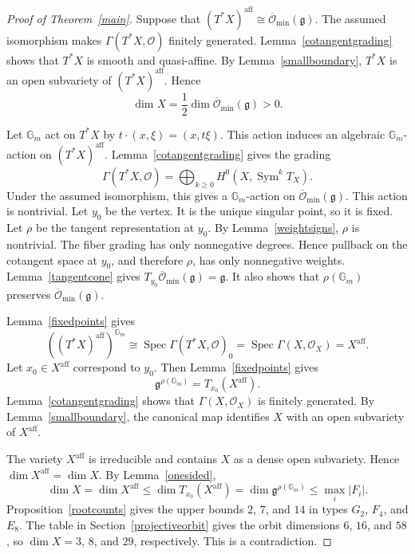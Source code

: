 \documentclass[10pt,a4paper]{amsart}
\DeclareMathOperator{\Spec}{Spec}
\DeclareMathOperator{\Sym}{Sym}
\newcommand{\Gm}{\mathbb G_m}
\newcommand{\Lieg}{\mathfrak{g}}
\newcommand{\OO}{\mathcal O}
\newcommand{\Ominbar}{\overline{\mathcal O}_{\min}}
\newcommand{\aff}{\mathrm{aff}}
\begin{document}
\begin{proof}[Proof of Theorem~\ref{main}]
    Suppose that $(T^*X)^\aff\cong\Ominbar(\Lieg)$. The assumed isomorphism makes $\Gamma(T^*X,\OO)$ finitely generated. Lemma~\ref{cotangentgrading} shows that $T^*X$ is smooth and quasi-affine. By Lemma~\ref{smallboundary}, $T^*X$ is an open subvariety of $(T^*X)^\aff$. Hence
    \[
        \dim X=\frac12\dim\Ominbar(\Lieg)>0.
    \]

    Let $\Gm$ act on $T^*X$ by $t\cdot(x,\xi)=(x,t\xi)$. This action induces an algebraic $\Gm$-action on $(T^*X)^\aff$. Lemma~\ref{cotangentgrading} gives the grading
    \[
        \Gamma(T^*X,\OO)
        =\bigoplus_{k\ge0}H^0(X,\Sym^kT_X).
    \]
    Under the assumed isomorphism, this gives a $\Gm$-action on $\Ominbar(\Lieg)$. This action is nontrivial. Let $y_0$ be the vertex. It is the unique singular point, so it is fixed. Let $\rho$ be the tangent representation at $y_0$. By Lemma~\ref{weightsigns}, $\rho$ is nontrivial. The fiber grading has only nonnegative degrees. Hence pullback on the cotangent space at $y_0$, and therefore $\rho$, has only nonnegative weights. Lemma~\ref{tangentcone} gives $T_{y_0}\Ominbar(\Lieg)=\Lieg$. It also shows that $\rho(\Gm)$ preserves $\Ominbar(\Lieg)$.

    Lemma~\ref{fixedpoints} gives
    \[
        \left((T^*X)^\aff\right)^{\Gm}
        \cong\Spec\Gamma(T^*X,\OO)_0
        =\Spec\Gamma(X,\OO_X)
        =X^\aff.
    \]
    Let $x_0\in X^\aff$ correspond to $y_0$. Then Lemma~\ref{fixedpoints} gives
    \[
        \Lieg^{\rho(\Gm)}=T_{x_0}(X^\aff).
    \]
    Lemma~\ref{cotangentgrading} shows that $\Gamma(X,\OO_X)$ is finitely generated. By Lemma~\ref{smallboundary}, the canonical map identifies $X$ with an open subvariety of $X^\aff$.

    The variety $X^\aff$ is irreducible and contains $X$ as a dense open subvariety. Hence $\dim X^\aff=\dim X$. By Lemma~\ref{onesided},
    \[
        \dim X=\dim X^\aff
        \le\dim T_{x_0}(X^\aff)
        =\dim\Lieg^{\rho(\Gm)}\le\max_i|F_i|.
    \]
    Proposition~\ref{rootcounts} gives the upper bounds $2$, $7$, and $14$ in types $G_2$, $F_4$, and $E_8$. The table in Section~\ref{projectiveorbit} gives the orbit dimensions $6$, $16$, and $58$, so $\dim X=3$, $8$, and $29$, respectively. This is a contradiction.
\end{proof}
\end{document}
